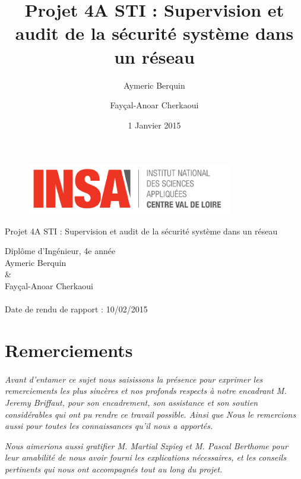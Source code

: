 \documentclass[11pt,a4paper,titlepage, oneside]{article}
\title{Projet 4A STI : Supervision et audit de la sécurité système dans un réseau}
\author{Aymeric Berquin \and Fayçal-Anoar Cherkaoui}
\date{1 Janvier 2015}
\begin{document}
\begin{titlepage}
 \thispagestyle{empty}
\begin{figure}[h]
  \centering
  \includegraphics[width=0.8\textwidth,natwidth=610,natheight=642]{images/logo.png}
\end{figure}
\vspace{0,5cm}
\begin{center} 
\Huge{\textbf{{\color{red}}}Projet 4A STI : Supervision et audit de la sécurité système dans un réseau}
\\
\vspace{1.5 cm}

\vspace{1cm}
\large{Diplôme d'Ingénieur, 4e année}
\\
\vspace{1cm}
\large{Aymeric Berquin \\ \& \\ Fayçal-Anoar Cherkaoui}
\vspace{1 cm}
\paragraph{}
	\Large{Date de rendu de rapport : 10/02/2015}
	\\
	
\vspace{1.5 cm}
\end{center} 
\end{titlepage} 
\normalsize
\newpage
\section*{\textbf{Remerciements}}
\thispagestyle{empty}
	\paragraph{}
	\begin{large}
	
	\textit{
	Avant d’entamer ce sujet nous saisissons la présence pour exprimer les remerciements les plus sincères et nos profonds respects à notre encadrant M. Jeremy Briffaut, pour son encadrement, son assistance et son soutien considérables qui ont pu rendre ce travail possible. Ainsi que Nous le remercions aussi pour toutes les connaissances qu'il nous a apportés.}
	
\textit{
Nous aimerions aussi gratifier M. Martial Szpieg et M. Pascal Berthome  pour leur amabilité de nous avoir fourni les explications nécessaires, et les conseils pertinents qui nous ont accompagnés tout au long du projet.}\end{large}
\newpage
\end{document}
